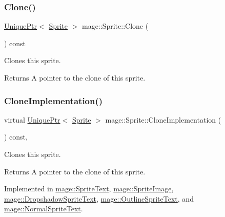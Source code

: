 \subsubsection{\texorpdfstring{Clone()}{Clone()}}
{\footnotesize\ttfamily \hyperlink{namespacemage_a3316d7143a973e37adf1110f2e80ca31}{Unique\+Ptr}$<$ \hyperlink{classmage_1_1_sprite}{Sprite} $>$ mage\+::\+Sprite\+::\+Clone (\begin{DoxyParamCaption}{ }\end{DoxyParamCaption}) const}

Clones this sprite.

\begin{DoxyReturn}{Returns}
A pointer to the clone of this sprite. 
\end{DoxyReturn}
\hypertarget{classmage_1_1_sprite_a214890d7da493bccadb2327b8c7ffb09}{}\label{classmage_1_1_sprite_a214890d7da493bccadb2327b8c7ffb09} 
\subsubsection{\texorpdfstring{Clone\+Implementation()}{CloneImplementation()}}
{\footnotesize\ttfamily virtual \hyperlink{namespacemage_a3316d7143a973e37adf1110f2e80ca31}{Unique\+Ptr}$<$ \hyperlink{classmage_1_1_sprite}{Sprite} $>$ mage\+::\+Sprite\+::\+Clone\+Implementation (\begin{DoxyParamCaption}{ }\end{DoxyParamCaption}) const\hspace{0.3cm}{\ttfamily [private]}, {}}

Clones this sprite.

\begin{DoxyReturn}{Returns}
A pointer to the clone of this sprite. 
\end{DoxyReturn}


Implemented in \hyperlink{classmage_1_1_sprite_text_aa2c63346f5ad7f63f7a6d474df3556ef}{mage\+::\+Sprite\+Text}, \hyperlink{classmage_1_1_sprite_image_ad6460971fc4ffb425b7a43d27c9b05b2}{mage\+::\+Sprite\+Image}, \hyperlink{classmage_1_1_dropshadow_sprite_text_af997217dd243061e0490bbcd4bfde7ed}{mage\+::\+Dropshadow\+Sprite\+Text}, \hyperlink{classmage_1_1_outline_sprite_text_ac1fcc7e91b972b250e09fbb8d62f908d}{mage\+::\+Outline\+Sprite\+Text}, and \hyperlink{classmage_1_1_normal_sprite_text_acab5b61f8be4a475cd54b51278956e37}{mage\+::\+Normal\+Sprite\+Text}.

